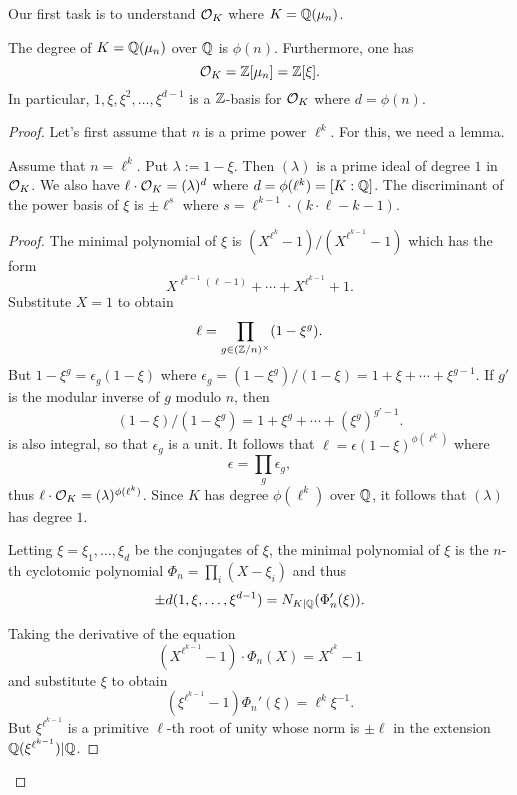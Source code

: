 Our first task is to understand $\mathcal{O}_{K}$ where $K = \mathbb{Q}(\mu_{n})$.
\begin{theorem}
  The degree of $K = \mathbb{Q}(\mu_{n})$ over $\mathbb{Q}$ is $\phi(n)$.
  Furthermore, one has
  \[ \mathcal{O}_{K} = \mathbb{Z}[\mu_{n}] = \mathbb{Z}[\xi]. \]
  In particular, $1,\xi,\xi^{2},\ldots,\xi^{d-1}$ is a $\mathbb{Z}$-basis for $\mathcal{O}_{K}$ where $d = \phi(n)$.
\end{theorem}
\begin{proof}
  Let's first assume that $n$ is a prime power $\ell^{k}$.
  For this, we need a lemma.
  \begin{lemma}
    Assume that $n = \ell^{k}$.
    Put $\lambda := 1 - \xi$.
    Then $(\lambda)$ is a prime ideal of degree $1$ in $\mathcal{O}_{K}$.
    We also have $\ell \cdot \mathcal{O}_{K} = (\lambda)^{d}$ where $d = \phi(\ell^{k}) = [K:\mathbb{Q}]$.
    The discriminant of the power basis of $\xi$ is $\pm \ell^{s}$ where $s = \ell^{k-1} \cdot (k \cdot \ell - k - 1)$.
  \end{lemma}
  \begin{proof}
    The minimal polynomial of $\xi$ is $(X^{\ell^{k}} - 1)/(X^{\ell^{k-1}}-1)$ which has the form
    \[ X^{\ell^{k-1}(\ell-1)} + \cdots + X^{\ell^{k-1}} + 1. \]
    Substitute $X = 1$ to obtain
    \[ \ell = \prod_{g \in (\mathbb{Z}/n)^{\times}} (1 - \xi^{g}). \]
    But $1 - \xi^{g} = \epsilon_{g} (1 - \xi)$ where $\epsilon_{g} = (1 - \xi^{g})/(1 - \xi) = 1 + \xi + \cdots + \xi^{g-1}$.
    If $g'$ is the modular inverse of $g$ modulo $n$, then
    \[ (1 - \xi)/(1-\xi^{g}) = 1 + \xi^{g} + \cdots + (\xi^{g})^{g'-1}. \]
    is also integral, so that $\epsilon_{g}$ is a unit.
    It follows that $\ell = \epsilon(1-\xi)^{\phi(\ell^{k})}$ where
    \[ \epsilon = \prod_{g} \epsilon_{g}, \]
    thus $\ell \cdot \mathcal{O}_{K} = (\lambda)^{\phi(\ell^{k})}$.
    Since $K$ has degree $\phi(\ell^{k})$ over $\mathbb{Q}$, it follows that $(\lambda)$ has degree $1$.

    Letting $\xi = \xi_{1},\ldots,\xi_{d}$ be the conjugates of $\xi$, the minimal polynomial of $\xi$ is the $n$-th cyclotomic polynomial $\Phi_{n} = \prod_{i}(X-\xi_{i})$ and thus
    \[ \pm d(1,\xi,\ldots,\xi^{d-1}) = N_{K|\mathbb{Q}}(\Phi_{n}'(\xi)). \]

    Taking the derivative of the equation
    \[ (X^{\ell^{k-1}}-1) \cdot \Phi_{n}(X) = X^{\ell^{k}}-1 \]
    and substitute $\xi$ to obtain
    \[ (\xi^{\ell^{k-1}}-1) \Phi_{n}'(\xi) = \ell^{k} \xi^{-1}. \]
    But $\xi^{\ell^{k-1}}$ is a primitive $\ell$-th root of unity whose norm is $\pm \ell$ in the extension $\mathbb{Q}(\xi^{\ell^{k-1}})|\mathbb{Q}$.


\end{proof}
\end{proof}
